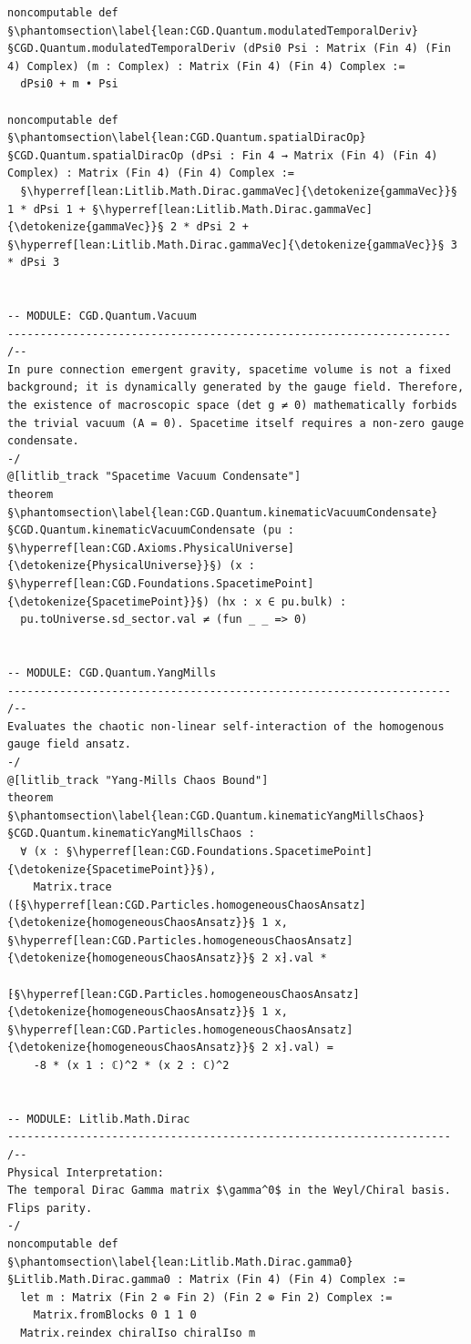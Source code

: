 \begin{verbatim}
noncomputable def §\phantomsection\label{lean:CGD.Quantum.modulatedTemporalDeriv}§CGD.Quantum.modulatedTemporalDeriv (dPsi0 Psi : Matrix (Fin 4) (Fin 4) Complex) (m : Complex) : Matrix (Fin 4) (Fin 4) Complex :=
  dPsi0 + m • Psi

noncomputable def §\phantomsection\label{lean:CGD.Quantum.spatialDiracOp}§CGD.Quantum.spatialDiracOp (dPsi : Fin 4 → Matrix (Fin 4) (Fin 4) Complex) : Matrix (Fin 4) (Fin 4) Complex :=
  §\hyperref[lean:Litlib.Math.Dirac.gammaVec]{\detokenize{gammaVec}}§ 1 * dPsi 1 + §\hyperref[lean:Litlib.Math.Dirac.gammaVec]{\detokenize{gammaVec}}§ 2 * dPsi 2 + §\hyperref[lean:Litlib.Math.Dirac.gammaVec]{\detokenize{gammaVec}}§ 3 * dPsi 3


-- MODULE: CGD.Quantum.Vacuum
--------------------------------------------------------------------
/--
In pure connection emergent gravity, spacetime volume is not a fixed background; it is dynamically generated by the gauge field. Therefore, the existence of macroscopic space (det g ≠ 0) mathematically forbids the trivial vacuum (A = 0). Spacetime itself requires a non-zero gauge condensate.
-/
@[litlib_track "Spacetime Vacuum Condensate"]
theorem §\phantomsection\label{lean:CGD.Quantum.kinematicVacuumCondensate}§CGD.Quantum.kinematicVacuumCondensate (pu : §\hyperref[lean:CGD.Axioms.PhysicalUniverse]{\detokenize{PhysicalUniverse}}§) (x : §\hyperref[lean:CGD.Foundations.SpacetimePoint]{\detokenize{SpacetimePoint}}§) (hx : x ∈ pu.bulk) :
  pu.toUniverse.sd_sector.val ≠ (fun _ _ => 0)


-- MODULE: CGD.Quantum.YangMills
--------------------------------------------------------------------
/--
Evaluates the chaotic non-linear self-interaction of the homogenous gauge field ansatz.
-/
@[litlib_track "Yang-Mills Chaos Bound"]
theorem §\phantomsection\label{lean:CGD.Quantum.kinematicYangMillsChaos}§CGD.Quantum.kinematicYangMillsChaos :
  ∀ (x : §\hyperref[lean:CGD.Foundations.SpacetimePoint]{\detokenize{SpacetimePoint}}§),
    Matrix.trace (⁅§\hyperref[lean:CGD.Particles.homogeneousChaosAnsatz]{\detokenize{homogeneousChaosAnsatz}}§ 1 x, §\hyperref[lean:CGD.Particles.homogeneousChaosAnsatz]{\detokenize{homogeneousChaosAnsatz}}§ 2 x⁆.val *
                  ⁅§\hyperref[lean:CGD.Particles.homogeneousChaosAnsatz]{\detokenize{homogeneousChaosAnsatz}}§ 1 x, §\hyperref[lean:CGD.Particles.homogeneousChaosAnsatz]{\detokenize{homogeneousChaosAnsatz}}§ 2 x⁆.val) =
    -8 * (x 1 : ℂ)^2 * (x 2 : ℂ)^2


-- MODULE: Litlib.Math.Dirac
--------------------------------------------------------------------
/--
Physical Interpretation:
The temporal Dirac Gamma matrix $\gamma^0$ in the Weyl/Chiral basis. Flips parity.
-/
noncomputable def §\phantomsection\label{lean:Litlib.Math.Dirac.gamma0}§Litlib.Math.Dirac.gamma0 : Matrix (Fin 4) (Fin 4) Complex :=
  let m : Matrix (Fin 2 ⊕ Fin 2) (Fin 2 ⊕ Fin 2) Complex :=
    Matrix.fromBlocks 0 1 1 0
  Matrix.reindex chiralIso chiralIso m


\end{verbatim}
